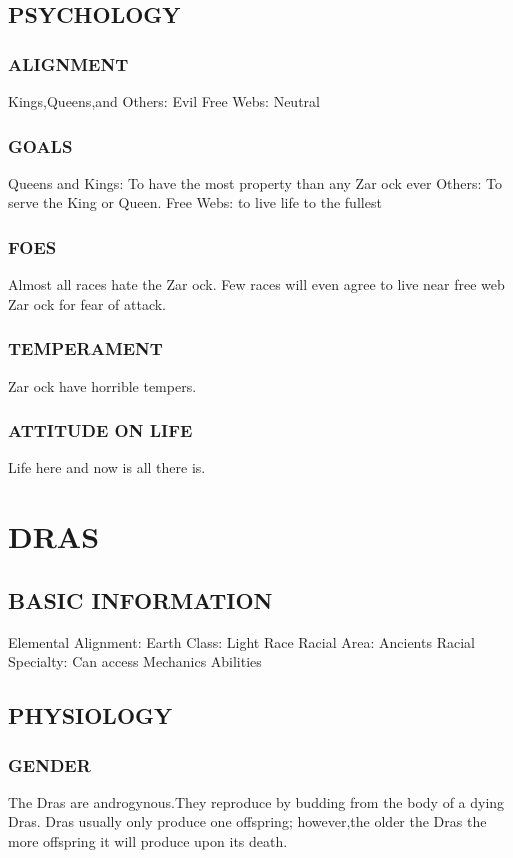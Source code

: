 \subsection{PSYCHOLOGY}
\subsubsection{ALIGNMENT}
Kings,Queens,and Others: Evil
Free Webs: Neutral
\subsubsection{GOALS}
Queens and Kings: To have the most property than any Zar ock ever
Others: To serve the King or Queen.
Free Webs: to live life to the fullest
\subsubsection{FOES}
Almost all races hate the Zar ock.  Few races will even agree to live near free
web Zar ock for fear of attack.
\subsubsection{TEMPERAMENT}
Zar ock have horrible tempers.
\subsubsection{ATTITUDE ON LIFE}
Life here and now is all there is.
\section{DRAS}
\subsection{BASIC INFORMATION}
Elemental Alignment: Earth
Class: Light Race
Racial Area: Ancients
Racial Specialty: Can access Mechanics Abilities
\subsection{PHYSIOLOGY}
\subsubsection{GENDER }
The Dras are androgynous.They reproduce by budding from the body of a dying
Dras.  Dras usually only produce one offspring; however,the older the Dras the
more offspring it will produce upon its death.
